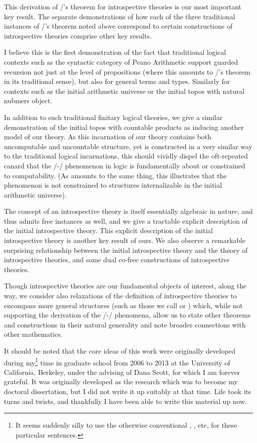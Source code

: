 This derivation of \Loeb/'s theorem for introspective theories is our most important key result. The separate demonstrations of how each of the three traditional instances of \Loeb/'s theorem noted above correspond to certain constructions of introspective theories comprise other key results.

I believe this is the first demonstration of the fact that traditional logical contexts such as the syntactic category of Peano Arithmetic support guarded recursion not just at the level of propositions (where this amounts to \Loeb/'s theorem in its traditional sense), but also for general terms and types. Similarly for contexts such as the initial arithmetic universe or the initial topos with natural nubmers object.

In addition to such traditional finitary logical theories, we give a similar demonstration of the initial topos with countable products as inducing another model of our theory. As this incarnation of our theory contains both uncomputable and uncountable structure, yet is constructed in a very similar way to the traditional logical incarnations, this should vividly dispel the oft-repeated canard that the \Godel/-\Lob/ phenomenon in logic is fundamentally about or constrained to computability. (As amounts to the same thing, this illustrates that the phenomenon is not constrained to structures internalizable in the initial arithmetic universe).

The concept of an introspective theory is itself essentially algebraic in nature, and thus admits free instances as well, and we give a tractable explicit description of the initial introspective theory. This explicit description of the initial introspective theory is another key result of ours. We also observe a remarkable surprising relationship between the initial introspective theory and the theory of introspective theories, and some dual co-free constructions of introspective theories.

Though introspective theories are our fundamental objects of interest, along the way, we consider also relaxations of the definition of introspective theories to encompass more general structures (such as those we call  or ) which, while not supporting the derivation of the \Godel/-\Lob/ phenomena, allow us to state other theorems and constructions in their natural generality and note broader connections with other mathematics.

It should be noted that the core ideas of this work were originally developed during my\footnote{It seems suddenly silly to use the otherwise conventional , , etc, for these particular sentences.} time in graduate school from 2006 to 2013 at the University of California, Berkeley, under the advising of Dana Scott, for which I am forever grateful. It was originally developed as the research which was to become my doctoral dissertation, but I did not write it up suitably at that time. Life took its turns and twists, and thankfully I have been able to write this material up now.

\fileend